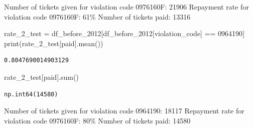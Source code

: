 \documentclass[
]{article}
\newenvironment{Shaded}{\begin{snugshade}}{\end{snugshade}}
\newcommand{\BuiltInTok}[1]{\textcolor[rgb]{0.00,0.23,0.31}{#1}}
\newcommand{\NormalTok}[1]{\textcolor[rgb]{0.00,0.23,0.31}{#1}}
\newcommand{\OperatorTok}[1]{\textcolor[rgb]{0.37,0.37,0.37}{#1}}
\newcommand{\StringTok}[1]{\textcolor[rgb]{0.13,0.47,0.30}{#1}}
\begin{document}
Number of tickets given for violation code 0976160F: 21906 Repayment
rate for violation code 0976160F: 61\% Number of tickets paid: 13316

\begin{Shaded}
\begin{Highlighting}[]
\NormalTok{rate\_2\_test }\OperatorTok{=}\NormalTok{ df\_before\_2012[df\_before\_2012[}\StringTok{\textquotesingle{}violation\_code\textquotesingle{}}\NormalTok{] }\OperatorTok{==} \StringTok{\textquotesingle{}0964190\textquotesingle{}}\NormalTok{]}
\BuiltInTok{print}\NormalTok{(rate\_2\_test[}\StringTok{\textquotesingle{}paid\textquotesingle{}}\NormalTok{].mean())}
\end{Highlighting}
\end{Shaded}

\begin{verbatim}
0.8047690014903129
\end{verbatim}

\begin{Shaded}
\begin{Highlighting}[]
\NormalTok{rate\_2\_test[}\StringTok{\textquotesingle{}paid\textquotesingle{}}\NormalTok{].}\BuiltInTok{sum}\NormalTok{()}
\end{Highlighting}
\end{Shaded}

\begin{verbatim}
np.int64(14580)
\end{verbatim}

Number of tickets given for violation code 0964190: 18117 Repayment rate
for violation code 0976160F: 80\% Number of tickets paid: 14580
\end{document}

